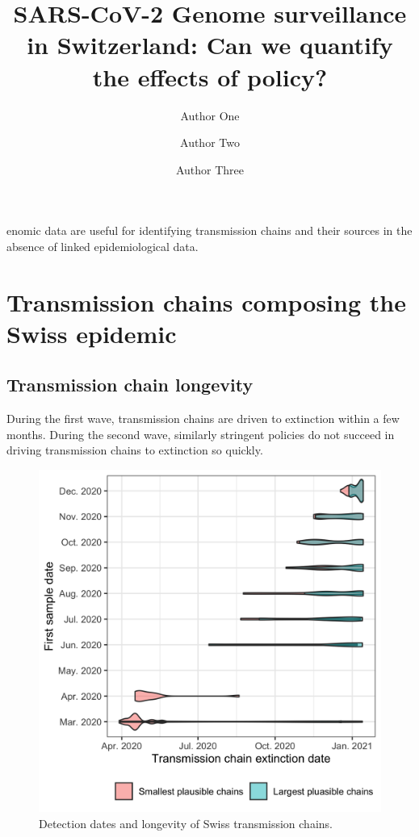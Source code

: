 \documentclass[9pt,twocolumn,twoside,lineno]{pnas-new}
\title{SARS-CoV-2 Genome surveillance in Switzerland: Can we quantify the effects of policy?}
\author[a,c,1]{Author One}
\author[b,1,2]{Author Two}
\author[a]{Author Three}
\affil[a]{Affiliation One}
\affil[b]{Affiliation Two}
\affil[c]{Affiliation Three}
\begin{document}
\maketitle
\thispagestyle{firststyle}

enomic data are useful for identifying transmission chains and their sources in the absence of linked epidemiological data.

\section*{Transmission chains composing the Swiss epidemic}

\subsection{Transmission chain longevity}
During the first wave, transmission chains are driven to extinction within a few months. During the second wave, similarly stringent policies do not succeed in driving transmission chains to extinction so quickly.

\begin{figure}[tbhp]
\centering
\includegraphics[width=.8\linewidth]{figures/fig_1_chain_longevity.png}
\caption{Detection dates and longevity of Swiss transmission chains.}
\label{fig:chain-description}
\end{figure}
\end{document}
